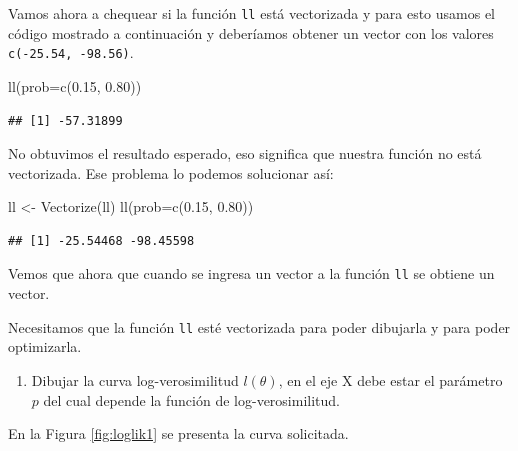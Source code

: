 \documentclass[
]{book}
\makeatletter
\newenvironment{Shaded}{\begin{snugshade}}{\end{snugshade}}
\newcommand{\AttributeTok}[1]{\textcolor[rgb]{0.77,0.63,0.00}{#1}}
\newcommand{\FloatTok}[1]{\textcolor[rgb]{0.00,0.00,0.81}{#1}}
\newcommand{\FunctionTok}[1]{\textcolor[rgb]{0.00,0.00,0.00}{#1}}
\newcommand{\NormalTok}[1]{#1}
\newcommand{\OtherTok}[1]{\textcolor[rgb]{0.56,0.35,0.01}{#1}}
\providecommand{\tightlist}{%
  \setlength{\itemsep}{0pt}\setlength{\parskip}{0pt}}
\newenvironment{kframe}{%
\medskip{}
\setlength{\fboxsep}{.8em}
 \def\at@end@of@kframe{}%
 \ifinner\ifhmode%
  \def\at@end@of@kframe{\end{minipage}}%
  \begin{minipage}{\columnwidth}%
 \fi\fi%
 \def\FrameCommand##1{\hskip\@totalleftmargin \hskip-\fboxsep
 \colorbox{shadecolor}{##1}\hskip-\fboxsep
     \hskip-\linewidth \hskip-\@totalleftmargin \hskip\columnwidth}%
 \MakeFramed {\advance\hsize-\width
   \@totalleftmargin\z@ \linewidth\hsize
   \@setminipage}}%
 {\par\unskip\endMakeFramed%
 \at@end@of@kframe}
\renewenvironment{Shaded}{\begin{kframe}}{\end{kframe}}
\newenvironment{rmdblock}[1]
  {
  \begin{itemize}
  \renewcommand{\labelitemi}{
    \raisebox{-.7\height}[0pt][0pt]{
      {\setkeys{Gin}{width=3em,keepaspectratio}\texttt{[image: images/\#1]}}
    }
  }
  \setlength{\fboxsep}{1em}
  \begin{kframe}
  \item
  }
  {
  \end{kframe}
  \end{itemize}
  }
\newenvironment{rmdnote}
  {\begin{rmdblock}{note}}
  {\end{rmdblock}}
\makeatother
\begin{document}
Vamos ahora a chequear si la función \texttt{ll} está vectorizada y para esto usamos el código mostrado a continuación y deberíamos obtener un vector con los valores \texttt{c(-25.54,\ -98.56)}.

\begin{Shaded}
\begin{Highlighting}[]
\FunctionTok{ll}\NormalTok{(}\AttributeTok{prob=}\FunctionTok{c}\NormalTok{(}\FloatTok{0.15}\NormalTok{, }\FloatTok{0.80}\NormalTok{))}
\end{Highlighting}
\end{Shaded}

\begin{verbatim}
## [1] -57.31899
\end{verbatim}

No obtuvimos el resultado esperado, eso significa que nuestra función no está vectorizada. Ese problema lo podemos solucionar así:

\begin{Shaded}
\begin{Highlighting}[]
\NormalTok{ll }\OtherTok{\textless{}{-}} \FunctionTok{Vectorize}\NormalTok{(ll)}
\FunctionTok{ll}\NormalTok{(}\AttributeTok{prob=}\FunctionTok{c}\NormalTok{(}\FloatTok{0.15}\NormalTok{, }\FloatTok{0.80}\NormalTok{))}
\end{Highlighting}
\end{Shaded}

\begin{verbatim}
## [1] -25.54468 -98.45598
\end{verbatim}

Vemos que ahora que cuando se ingresa un vector a la función \texttt{ll} se obtiene un vector.

\begin{rmdnote}
Necesitamos que la función \texttt{ll} esté vectorizada para poder dibujarla y para poder optimizarla.
\end{rmdnote}

\begin{enumerate}
\def\labelenumi{\arabic{enumi})}
\setcounter{enumi}{2}
\tightlist
\item
  Dibujar la curva log-verosimilitud \(l(\theta)\), en el eje X debe estar el parámetro \(p\) del cual depende la función de log-verosimilitud.
\end{enumerate}

En la Figura \ref{fig:loglik1} se presenta la curva solicitada.
\end{document}
